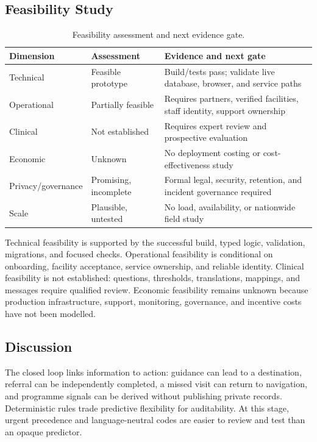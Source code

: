 \documentclass[12pt,onecolumn]{IEEEtran}
\begin{document}
\subsection{Feasibility Study}
\begin{table}[H]
\caption{Feasibility assessment and next evidence gate.}\label{tab:feasibility}\centering\small
\begin{tabularx}{\textwidth}{p{}p{}X}
\toprule Dimension & Assessment & Evidence and next gate \\\midrule
Technical & Feasible prototype & Build/tests pass; validate live database, browser, and service paths \\
Operational & Partially feasible & Requires partners, verified facilities, staff identity, support ownership \\
Clinical & Not established & Requires expert review and prospective evaluation \\
Economic & Unknown & No deployment costing or cost-effectiveness study \\
Privacy/governance & Promising, incomplete & Formal legal, security, retention, and incident governance required \\
Scale & Plausible, untested & No load, availability, or nationwide field study \\
\bottomrule
\end{tabularx}
\end{table}

Technical feasibility is supported by the successful build, typed logic, validation, migrations, and focused checks. Operational feasibility is conditional on onboarding, facility acceptance, service ownership, and reliable identity. Clinical feasibility is not established: questions, thresholds, translations, mappings, and messages require qualified review. Economic feasibility remains unknown because production infrastructure, support, monitoring, governance, and incentive costs have not been modelled.

\subsection{Discussion}
The closed loop links information to action: guidance can lead to a destination, referral can be independently completed, a missed visit can return to navigation, and programme signals can be derived without publishing private records. Deterministic rules trade predictive flexibility for auditability. At this stage, urgent precedence and language-neutral codes are easier to review and test than an opaque predictor.
\end{document}
